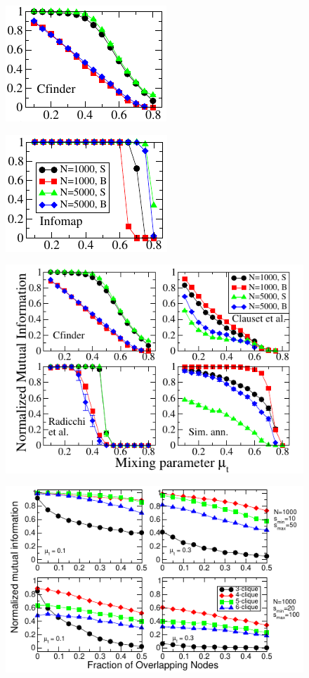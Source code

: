 \begin{figure}
    \centering
    \includegraphics{lfrpaper/fig2_a_sub.pdf}
\end{figure}

\begin{figure}
    \centering
    \includegraphics{lfrpaper/fig2_b.pdf}
\end{figure}

\begin{figure}
    \centering
    \includegraphics{lfrpaper/fig2_b_sub.pdf}
\end{figure}

\begin{figure}
    \centering
    \includegraphics{lfrpaper/fig6.pdf}
\end{figure}

